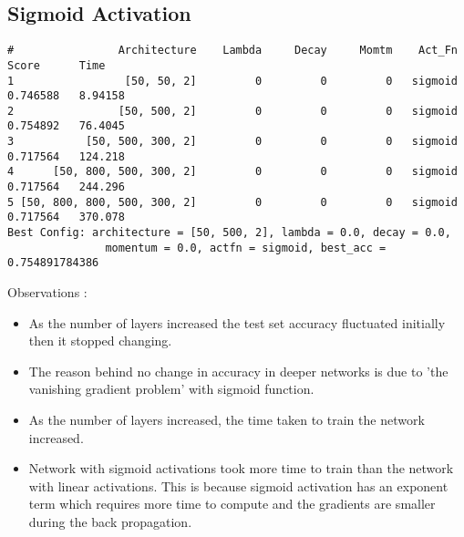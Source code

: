 \documentclass[letter,doc,notimes]{article}
\begin{document}
\subsection{Sigmoid Activation}
\begin{verbatim}
#                Architecture    Lambda     Decay     Momtm    Act_Fn     Score      Time
1                 [50, 50, 2]         0         0         0   sigmoid  0.746588   8.94158
2                [50, 500, 2]         0         0         0   sigmoid  0.754892   76.4045
3           [50, 500, 300, 2]         0         0         0   sigmoid  0.717564   124.218
4      [50, 800, 500, 300, 2]         0         0         0   sigmoid  0.717564   244.296
5 [50, 800, 800, 500, 300, 2]         0         0         0   sigmoid  0.717564   370.078
Best Config: architecture = [50, 500, 2], lambda = 0.0, decay = 0.0,
               momentum = 0.0, actfn = sigmoid, best_acc = 0.754891784386
\end{verbatim}
Observations :
\begin{itemize}
	\item As the number of layers increased the test set accuracy fluctuated initially then it stopped changing.
	\item The reason behind no change in accuracy in deeper networks is due to 'the vanishing gradient problem' with sigmoid function.
	\item As the number of layers increased, the time taken to train the network increased.
	\item Network with sigmoid activations took more time to train than the network with linear activations. This is because sigmoid activation has an exponent term which requires more time to compute and the gradients are smaller during the back propagation.
\end{itemize}
\end{document}
